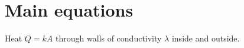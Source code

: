 \documentclass{article}
\begin{document}
\section*{Main equations}
Heat $Q = k A$ through walls of conductivity $\lambda$ inside and outside.
%
%
%
%
\printnomenclature
\end{document}
